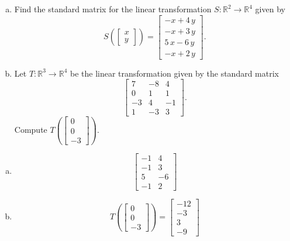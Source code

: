 
\begin{exerciseStatement}

\begin{enumerate}[(a)]
\item Find the standard matrix for the linear transformation \(S:\mathbb{R}^ 2  \to \mathbb{R}^ 4 \) given by \[S\left(  \left[\begin{array}{c}
x \\
y
\end{array}\right]  \right) =  \left[\begin{array}{c}
-x + 4 \, y \\
-x + 3 \, y \\
5 \, x - 6 \, y \\
-x + 2 \, y
\end{array}\right] .\]
\item Let \(T:\mathbb{R}^ 3  \to \mathbb{R}^ 4 \) be the linear transformation given by the standard matrix \[ \left[\begin{array}{ccc}
7 & -8 & 4 \\
0 & 1 & 1 \\
-3 & 4 & -1 \\
1 & -3 & 3
\end{array}\right] .\] Compute \(T\left( \left[\begin{array}{c}
0 \\
0 \\
-3
\end{array}\right]  \right)\). 
\end{enumerate}
    
\end{exerciseStatement}
    
\begin{exerciseAnswer} 

\begin{enumerate}[(a)]
\item \[ \left[\begin{array}{cc}
-1 & 4 \\
-1 & 3 \\
5 & -6 \\
-1 & 2
\end{array}\right] \]
\item \[T\left( \left[\begin{array}{c}
0 \\
0 \\
-3
\end{array}\right]  \right)= \left[\begin{array}{c}
-12 \\
-3 \\
3 \\
-9
\end{array}\right] \]
\end{enumerate}
    
\end{exerciseAnswer}
    
